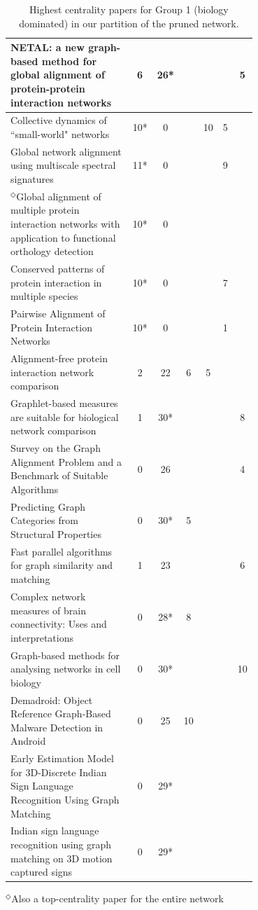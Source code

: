 \documentclass[12pt]{thesis}
\theoremstyle{plain}
\theoremstyle{definition}
\theoremstyle{remark}
\begin{document}
\begin{table}[H]
{\begin{tabular}{|L{0.7\linewidth}|c|c|c|c|c|c|}
NETAL: a new graph-based method for global alignment of protein-protein interaction networks  \cite{Neyshabur_2013} & 6 & 26* &  &  &  & 5 \\ \hline
Collective dynamics of ``small-world" networks  \cite{Watts_1998} & 10* & 0 &  & 10 & 5 &  \\ \hline
Global network alignment using multiscale spectral signatures  \cite{Patro_2012} & 11* & 0 &  &  & 9 &  \\ \hline
$^\Diamond$Global alignment of multiple protein interaction networks with application to functional orthology detection  \cite{Singh_2008} & 10* & 0 &  &  &  &  \\ \hline
Conserved patterns of protein interaction in multiple species  \cite{Sharan_2005} & 10* & 0 &  &  & 7 &  \\ \hline
Pairwise Alignment of Protein Interaction Networks  \cite{Koyuturk_2006} & 10* & 0 &  &  & 1 &  \\ \hline
Alignment-free protein interaction network comparison  \cite{Ali_2014} & 2 & 22 & 6 & 5 &  &  \\ \hline
Graphlet-based measures are suitable for biological network comparison  \cite{Hayes_2013} & 1 & 30* &  &  &  & 8 \\ \hline
Survey on the Graph Alignment Problem and a Benchmark of Suitable Algorithms  \cite{Dopmann_2013} & 0 & 26 &  &  &  & 4 \\ \hline
Predicting Graph Categories from Structural Properties  \cite{Canning_2018} & 0 & 30* & 5 &  &  &  \\ \hline
Fast parallel algorithms for graph similarity and matching  \cite{Kollias_2014} & 1 & 23 &  &  &  & 6 \\ \hline
Complex network measures of brain connectivity: Uses and interpretations  \cite{Rubinov_2010} & 0 & 28* & 8 &  &  &  \\ \hline
Graph-based methods for analysing networks in cell biology  \cite{Aittokallio_2006} & 0 & 30* &  &  &  & 10 \\ \hline
Demadroid: Object Reference Graph-Based Malware Detection in Android  \cite{Wang_2018} & 0 & 25 & 10 &  &  &  \\ \hline
Early Estimation Model for 3D-Discrete Indian Sign Language Recognition Using Graph Matching  \cite{Kumar_2018a} & 0 & 29* &  &  &  &  \\ \hline
Indian sign language recognition using graph matching on 3D motion captured signs  \cite{Kumar_2018b} & 0 & 29* &  &  &  &  \\ \hline
\end{tabular}

\vspace{-.03cm}
$^\Diamond$Also a top-centrality paper for the entire network}
\caption{Highest centrality papers for Group 1 (biology dominated) in our partition of the pruned network.}
\label{tab:toppapers_bio}
\end{table}
\end{document}
